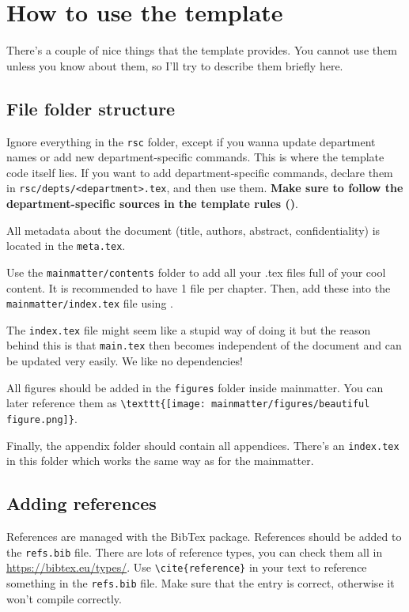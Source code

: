 \chapter*{How to use the template}
There's a couple of nice things that the template provides. You cannot use them unless you know about them, so I'll try to describe them briefly here.

\section*{File folder structure}
Ignore everything in the \verb|rsc| folder, except if you wanna update department names or add new department-specific commands. This is where the template code itself lies. If you want to add department-specific commands, declare them in \verb|rsc/depts/<department>.tex|, and then use them. \textbf{Make sure to follow the department-specific sources in the template rules ()}.

All metadata about the document (title, authors, abstract, confidentiality) is located in the \verb|meta.tex|. 

Use the \verb|mainmatter/contents| folder to add all your .tex files full of your cool content. It is recommended to have 1 file per chapter. Then, add these into the \verb|mainmatter/index.tex| file using \verb||.

The \verb|index.tex| file might seem like a stupid way of doing it but the reason behind this is that \verb|main.tex| then becomes independent of the document and can be updated very easily. We like no dependencies!

All figures should be added in the \verb|figures| folder inside mainmatter. You can later reference them as \verb|\texttt{[image: mainmatter/figures/beautiful figure.png]}|. 

Finally, the appendix folder should contain all appendices. There's an \verb|index.tex| in this folder which works the same way as for the mainmatter.


\section*{Adding references}

References are managed with the BibTex package. References should be added to the \verb|refs.bib| file. There are lots of reference types, you can check them all in \url{https://bibtex.eu/types/}. Use \verb|\cite{reference}| in your text to reference something in the \verb|refs.bib| file. Make sure that the entry is correct, otherwise it won't compile correctly. 

